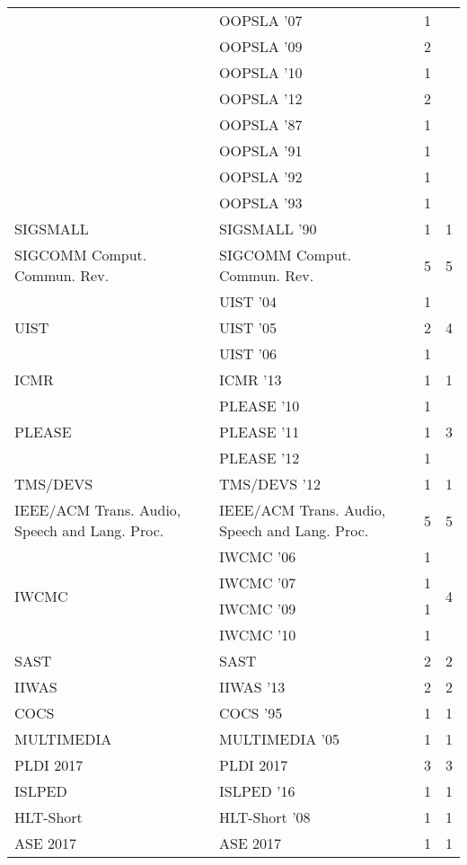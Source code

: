 \begin{table*}[t]
\begin{tabular}{llrr}
& OOPSLA '07 & 1 &\\
& OOPSLA '09 & 2 &\\
& OOPSLA '10 & 1 &\\
& OOPSLA '12 & 2 &\\
& OOPSLA '87 & 1 &\\
& OOPSLA '91 & 1 &\\
& OOPSLA '92 & 1 &\\
& OOPSLA '93 & 1 &\\
\multirow{1}{*}{SIGSMALL } & SIGSMALL '90 & 1 & \multirow{1}{*}{1}\\
\multirow{1}{*}{SIGCOMM Comput. Commun. Rev.} & SIGCOMM Comput. Commun. Rev. & 5 & \multirow{1}{*}{5}\\
\multirow{3}{*}{UIST } & UIST '04 & 1 & \multirow{3}{*}{4}\\
& UIST '05 & 2 &\\
& UIST '06 & 1 &\\
\multirow{1}{*}{ICMR } & ICMR '13 & 1 & \multirow{1}{*}{1}\\
\multirow{3}{*}{PLEASE } & PLEASE '10 & 1 & \multirow{3}{*}{3}\\
& PLEASE '11 & 1 &\\
& PLEASE '12 & 1 &\\
\multirow{1}{*}{TMS/DEVS } & TMS/DEVS '12 & 1 & \multirow{1}{*}{1}\\
\multirow{1}{*}{IEEE/ACM Trans. Audio, Speech and Lang. Proc.} & IEEE/ACM Trans. Audio, Speech and Lang. Proc. & 5 & \multirow{1}{*}{5}\\
\multirow{4}{*}{IWCMC } & IWCMC '06 & 1 & \multirow{4}{*}{4}\\
& IWCMC '07 & 1 &\\
& IWCMC '09 & 1 &\\
& IWCMC '10 & 1 &\\
\multirow{1}{*}{SAST} & SAST & 2 & \multirow{1}{*}{2}\\
\multirow{1}{*}{IIWAS } & IIWAS '13 & 2 & \multirow{1}{*}{2}\\
\multirow{1}{*}{COCS } & COCS '95 & 1 & \multirow{1}{*}{1}\\
\multirow{1}{*}{MULTIMEDIA } & MULTIMEDIA '05 & 1 & \multirow{1}{*}{1}\\
\multirow{1}{*}{PLDI 2017} & PLDI 2017 & 3 & \multirow{1}{*}{3}\\
\multirow{1}{*}{ISLPED } & ISLPED '16 & 1 & \multirow{1}{*}{1}\\
\multirow{1}{*}{HLT-Short } & HLT-Short '08 & 1 & \multirow{1}{*}{1}\\
\multirow{1}{*}{ASE 2017} & ASE 2017 & 1 & \multirow{1}{*}{1}\\

\end{tabular}
\end{table*}
